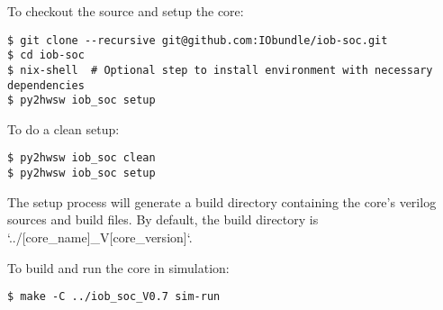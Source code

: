 To checkout the source and setup the core:

\begin{verbatim}
$ git clone --recursive git@github.com:IObundle/iob-soc.git
$ cd iob-soc
$ nix-shell  # Optional step to install environment with necessary dependencies
$ py2hwsw iob_soc setup
\end{verbatim}

To do a clean setup:

\begin{verbatim}
$ py2hwsw iob_soc clean
$ py2hwsw iob_soc setup
\end{verbatim}

The setup process will generate a build directory containing the core's verilog sources and build files.
By default, the build directory is `../[core\_name]\_V[core\_version]`.

To build and run the core in simulation:
\begin{verbatim}
$ make -C ../iob_soc_V0.7 sim-run
\end{verbatim}
